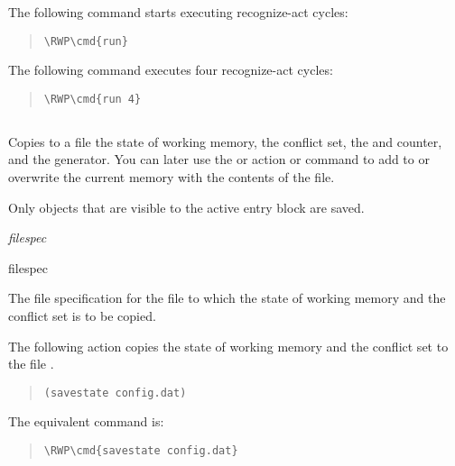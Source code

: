 {{The following command starts executing recognize-act cycles:

\begin{quote}
\begin{Verbatim}[commandchars=\\\{\}]
\RWP\cmd{run}
\end{Verbatim}
\end{quote}

The following command executes four recognize-act cycles:

\begin{quote}
\begin{Verbatim}[commandchars=\\\{\}]
\RWP\cmd{run 4}
\end{Verbatim}
\end{quote}

\subsection{}

Copies to a file the state of working memory, the conflict set, the
 and  counter, and the 
generator. You can later use the  or 
action or command to add to or overwrite the current memory with the
contents of the file.

Only objects that are visible to the active entry block are saved.

\Format

 \it{filespec}

\begin{argument}
\item[filespec]

  The file specification for the file to which the state of working
  memory and the conflict set is to be copied.
\end{argument}

\Example

The following action copies the state of working memory and
the conflict set to the file .

\begin{quote}
\begin{verbatim}
(savestate config.dat)
\end{verbatim}
\end{quote}

The equivalent command is:

\begin{quote}
\begin{Verbatim}[commandchars=\\\{\}]
\RWP\cmd{savestate config.dat}
\end{Verbatim}
\end{quote}

}}
